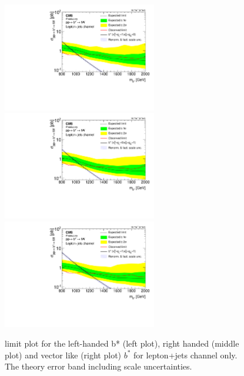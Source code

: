 \begin{figure}[htcb]

\centering
\includegraphics[width=0.6\textwidth]{AN-14-049/figs/bayesian_semileptonic_left_limit_band_plot}\\
\includegraphics[width=0.6\textwidth]{AN-14-049/figs/bayesian_semileptonic_right_limit_band_plot}\\
\includegraphics[width=0.6\textwidth]{AN-14-049/figs/bayesian_semileptonic_vector_limit_band_plot}
\caption{limit plot for the left-handed b* (left plot), right handed (middle plot) and vector like (right plot) $b^*$ for lepton+jets channel only. The theory error band including scale uncertainties.}
\label{figs:bslimitssemi}
\end{figure}

